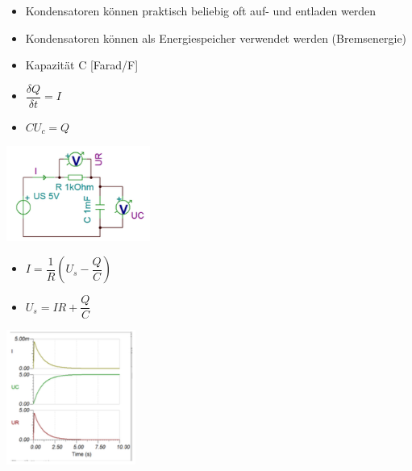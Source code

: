 \documentclass[8pt,a4paper]{scrartcl}
\begin{document}
\begin{multicols*}{3}
\begin{multicols*}{2}
				\begin{itemize}\itemsep0pt
					\item Kondensatoren können praktisch beliebig oft auf- und entladen werden
					\item Kondensatoren können als Energiespeicher verwendet werden (Bremsenergie)
					\item Kapazität C [Farad/F]
					\item $\dfrac{\delta Q} {\delta t} = I$
					\item $CU_{c}=Q$
				\end{itemize}
				
			 \end{multicols*}
			 
			 \begin{multicols*}{2}
				\includegraphics[height=3.1cm]{img/kondensator2.png} 
				
				\begin{itemize}\itemsep0pt
					\item $I = \dfrac{1}{R}(U_{s}-\dfrac{Q}{C})$
					\item $U_{s}=IR+\dfrac{Q}{C}$
				\end{itemize}
				
				\includegraphics[height=4.4cm]{img/kondensator3.png} 

			 \end{multicols*}


\end{multicols*}
\end{document}
